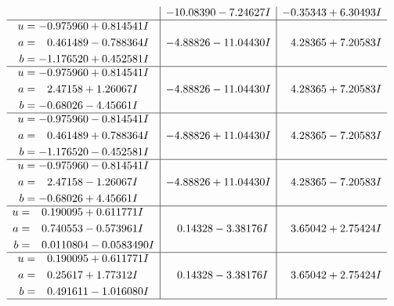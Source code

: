 \documentclass[1p]{elsarticle_modified}
\theoremstyle{definition}
\begin{document}
$$\begin{array}{c|c|c}
 & -10.08390 - 7.24627 I & -0.35343 + 6.30493 I \\ \hline\begin{aligned}
u &= -0.975960 + 0.814541 I \\
a &= \phantom{-}0.461489 - 0.788364 I \\
b &= -1.176520 + 0.452581 I\end{aligned}
 & -4.88826 - 11.04430 I & \phantom{-}4.28365 + 7.20583 I \\ \hline\begin{aligned}
u &= -0.975960 + 0.814541 I \\
a &= \phantom{-}2.47158 + 1.26067 I \\
b &= -0.68026 - 4.45661 I\end{aligned}
 & -4.88826 - 11.04430 I & \phantom{-}4.28365 + 7.20583 I \\ \hline\begin{aligned}
u &= -0.975960 - 0.814541 I \\
a &= \phantom{-}0.461489 + 0.788364 I \\
b &= -1.176520 - 0.452581 I\end{aligned}
 & -4.88826 + 11.04430 I & \phantom{-}4.28365 - 7.20583 I \\ \hline\begin{aligned}
u &= -0.975960 - 0.814541 I \\
a &= \phantom{-}2.47158 - 1.26067 I \\
b &= -0.68026 + 4.45661 I\end{aligned}
 & -4.88826 + 11.04430 I & \phantom{-}4.28365 - 7.20583 I \\ \hline\begin{aligned}
u &= \phantom{-}0.190095 + 0.611771 I \\
a &= \phantom{-}0.740553 - 0.573961 I \\
b &= \phantom{-}0.0110804 - 0.0583490 I\end{aligned}
 & \phantom{-}0.14328 - 3.38176 I & \phantom{-}3.65042 + 2.75424 I \\ \hline\begin{aligned}
u &= \phantom{-}0.190095 + 0.611771 I \\
a &= \phantom{-}0.25617 + 1.77312 I \\
b &= \phantom{-}0.491611 - 1.016080 I\end{aligned}
 & \phantom{-}0.14328 - 3.38176 I & \phantom{-}3.65042 + 2.75424 I\\
 \hline 
 \end{array}$$\newpage$$\begin{array}{c|c|c}  

\end{array}$$
\end{document}

